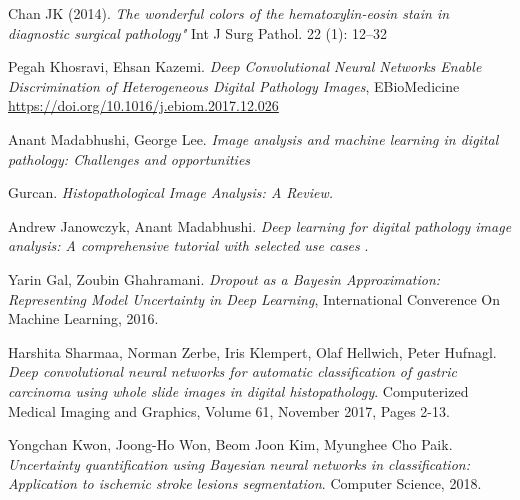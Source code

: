 \documentclass[12pt]{article}
\begin{document}
\begin{thebibliography}{9}
	
	  Chan JK (2014). \textit{The wonderful colors of the hematoxylin-eosin stain in diagnostic surgical pathology"} Int J Surg Pathol. 22 (1): 12–32 
	
	 Pegah Khosravi, Ehsan Kazemi. \textit{Deep Convolutional Neural Networks Enable Discrimination of Heterogeneous Digital Pathology Images}, EBioMedicine \url{https://doi.org/10.1016/j.ebiom.2017.12.026} 
	
	  Anant Madabhushi, George Lee. \textit{Image analysis and machine learning in digital pathology: Challenges and opportunities}
	
	 Gurcan. \textit{Histopathological Image Analysis: A Review.}
	 
	 Andrew Janowczyk, Anant Madabhushi. \textit{Deep learning for digital pathology image analysis: A comprehensive tutorial with selected use cases }. 

	
	Yarin Gal, Zoubin Ghahramani.	\textit{Dropout as a Bayesin Approximation: Representing Model Uncertainty in Deep Learning}, International Converence On Machine Learning, 2016.
	
	Harshita Sharmaa, Norman Zerbe, Iris Klempert, Olaf Hellwich, Peter Hufnagl. \textit{Deep convolutional neural networks for automatic classification of gastric carcinoma using whole slide images in digital histopathology}. Computerized Medical Imaging and Graphics, Volume 61, November 2017, Pages 2-13.
	
	 Yongchan Kwon, Joong-Ho Won, Beom Joon Kim, Myunghee Cho Paik. \textit{Uncertainty quantification using Bayesian neural networks in classification: Application to ischemic stroke lesions segmentation}. Computer Science, 2018.
	
\end{thebibliography}
\end{document}
